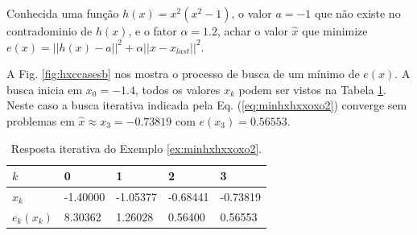 \begin{example}\label{ex:minhxhxxoxo2}
Conhecida uma função $h(x)=x^2(x^2-1)$, o valor $a=-1$ que não existe no contradominio de $h(x)$,
e o fator $\alpha=1.2$,
achar o valor $\hat{x}$ que minimize $e(x)=||h(x)-a||^2+\alpha||x-x_{last}||^2$.
\end{example}
\begin{SolutionT}\label{sol:minhxhxxoxo2}
 A Fig. \ref{fig:hxccasesb} nos mostra o processo de busca de um mínimo
 de $e(x)$. A busca inicia em $x_0=-1.4$,
 todos os valores $x_{k}$ podem ser vistos na Tabela \ref{tab:hxccases2}. 
Neste caso a busca iterativa indicada pela Eq. (\ref{eq:minhxhxxoxo2}) converge sem problemas 
em $\hat{x}\approx x_3 =-0.73819$ com $e(x_3)=0.56553$.
\end{SolutionT}

\begin{table}[!h]
\centering
\begin{tabular}{|l|l|l|l|l|}
\hline
$k$      & 0 & 1 & 2 & 3 \\ \hline
$x_k$    & -1.40000 & -1.05377 & -0.68441 & -0.73819 \\ \hline
$e_k(x_k)$ & 8.30362 &  1.26028 &  0.56400 &  0.56553 \\ \hline
\end{tabular}
\caption{Resposta iterativa do Exemplo \ref{ex:minhxhxxoxo2}.}
\label{tab:hxccases2}
\end{table}

